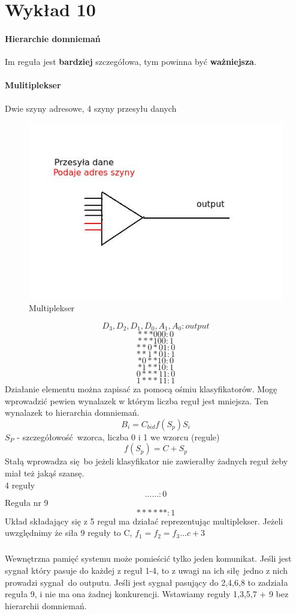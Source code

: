\documentclass{article}
\begin{document}
		\section{Wykład 10}
		\paragraph{Hierarchie domniemań} Im reguła jest \textbf{bardziej} szczegółowa, tym powinna być \textbf{ważniejsza}.
		\paragraph{Mulitiplekser}Dwie szyny adresowe, 4 szyny przesyłu danych\\
			\begin{figure}[ht]
				\label{fig:fig2}
				\centering
				\includegraphics[scale=0.5]{multiplekser.jpeg}
				\caption{Multiplekser}
			\end{figure} 
		$$D_3, D_2, D_1, D_0, A_1, A_0 : output $$
		$$***000:0$$
		$$***100:1$$
		$$**0*01:0$$
		$$**1*01:1$$
		$$*0**10:0$$
		$$*1**10:1$$
		$$0***11:0$$
		$$1***11:1$$
		Działanie elementu można zapisać za pomocą ośmiu klasyfikatorów. Mogę wprowadzić pewien wynalazek w którym liczba reguł jest mniejsza. Ten wynalazek to hierarchia domniemań. 
		$$B_i=C_{bid} f(S_p)S_i$$
		$S_P$ - szczegółowość wzorca, liczba 0 i 1 we wzorcu (regule)
		$$f(S_p)=C + S_p$$
		Stałą wprowadza się bo jeżeli klasyfikator nie zawierałby żadnych reguł żeby miał też jakąś szansę.\\
		4 reguły  $$......  : 0$$
		Reguła nr 9	$$******:1$$
		Układ składający się z 5 reguł ma działać reprezentując multiplekser. Jeżeli uwzględnimy że siła 9 reguły to C, $f_1=f_2=f_3...c+3$
		\subparagraph{}Wewnętrzna pamięć systemu może pomieścić tylko jeden komunikat. Jeśli jest sygnał który pasuje do każdej z reguł 1-4, to z uwagi na ich siłę jedno z nich prowadzi sygnał do outputu. Jeśli jest sygnał pasujący do 2,4,6,8 to zadziała reguła 9, i nie ma ona żadnej konkurencji. Wstawiamy reguły 1,3,5,7 + 9 bez hierarchii domniemań.
		
\end{document}
